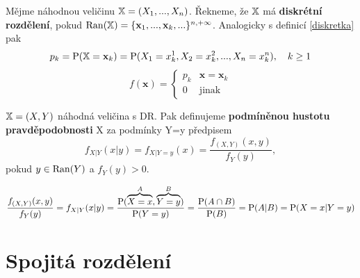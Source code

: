 \begin{remark}
	Mějme náhodnou veličinu $ \mathbb{X}=(X_1,...,X_n)$. Řekneme, že $\mathbb{X}$ má \textbf{diskrétní rozdělení}, pokud $ \mathop{\mathrm{Ran}}(\mathbb{X})=\{ \textbf{x}_1,...,\textbf{x}_k,... \}^{n,+\infty} $. Analogicky s definicí \ref{diskretka} pak
	$$ p_k=\mathrm{P}(\mathbb{X}=\textbf{x}_k)=\mathrm{P}(X_1=x_k^1,X_2=x_k^2,...,X_n=x_k^n),~~~k\geq 1 $$
	\[
	f(\textbf{x})=\begin{cases}
	p_k & \textbf{x}=\textbf{x}_k \\
	0 & \text{jinak}
	\end{cases}
	\]
\end{remark}
\begin{define}
	$ \mathbb{X}=(X,Y) $ náhodná veličina s DR. Pak definujeme \textbf{podmíněnou hustotu pravděpodobnosti} X za podmínky Y=y předpisem\[
	f_{X|Y}(x|y)=f_{X|Y=y}(x)=\frac{f_{(X,Y)}(x,y)}{f_Y(y)},
	\]
	pokud $ y \in \mathop{\mathrm{Ran}}(Y) $ a $ f_Y(y)> 0 $.
\end{define}
\begin{remark}
	$$ \frac{f_{(X,Y)}(x,y)}{f_Y(y)}= 	f_{X|Y}(x|y)=\frac{\mathrm{P}(\overbrace{X=x}^{A},\overbrace{Y=y}^{B})}{\mathrm{P}(Y=y)}=\frac{\mathrm{P}(A\cap B)}{\mathrm{P}(B)}=\mathrm{P}(A|B)=\mathrm{P}(X=x|Y=y) $$
\end{remark}







\chapter{Spojitá rozdělení}

